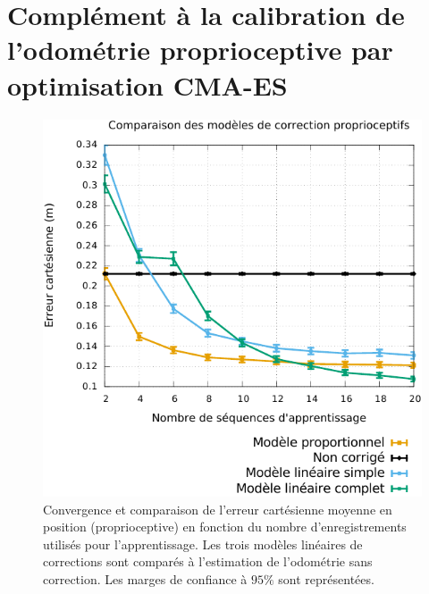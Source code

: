 \chapter{Complément à la calibration de l'odométrie proprioceptive 
par optimisation CMA-ES\label{sec:odometry_cmaes_read_plots}}

\begin{figure}[h]
    \centerfloat
    \includegraphics[type=pdf,ext=.pdf,read=.pdf,width=0.8\linewidth]{../plot/OdometryCMAES/convergenceReads}
    \caption{\label{fig:odometry_cmaes_convergence_reads} 
        Convergence et comparaison de l'erreur cartésienne moyenne en position (proprioceptive)
        en fonction du nombre d'enregistrements utilisés pour l'apprentissage.
        Les trois modèles linéaires de corrections sont comparés à l'estimation
        de l'odométrie sans correction.
        Les marges de confiance à $95\%$ sont représentées.
    }
\end{figure}

